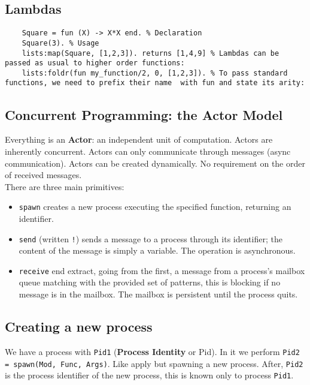 \subsection{Lambdas}
\begin{lstlisting}
	Square = fun (X) -> X*X end. % Declaration
	Square(3). % Usage
	lists:map(Square, [1,2,3]). returns [1,4,9] % Lambdas can be passed as usual to higher order functions:
	lists:foldr(fun my_function/2, 0, [1,2,3]). % To pass standard functions, we need to prefix their name	with fun and state its arity:
\end{lstlisting}

\subsection{Concurrent Programming: the Actor Model}
Everything is an \textbf{Actor}: an independent unit of computation.
Actors are inherently concurrent.
Actors can only communicate through messages (async communication).
Actors can be created dynamically.
No requirement on the order of received messages.\\
There are three main primitives:
\begin{itemize}
	\item \texttt{spawn} creates a new process executing the specified function, returning an identifier.
	\item \texttt{send} (written \texttt{!}) sends a message to a process through its identifier; the content of the message is simply a variable. The operation is asynchronous.
	\item \texttt{receive} end extract, going from the first, a message from a process’s mailbox queue matching with the provided set of patterns, this is blocking if no message is in the mailbox. The mailbox is persistent until the process quits.
\end{itemize}

\subsection{Creating a new process}
We have a process with \texttt{Pid1} (\textbf{Process Identity} or Pid).
In it we perform \texttt{Pid2 = spawn(Mod, Func, Args)}.
Like apply but spawning a new process.
After, \texttt{Pid2} is the process identifier of the new process, this is known only to process \texttt{Pid1}.


